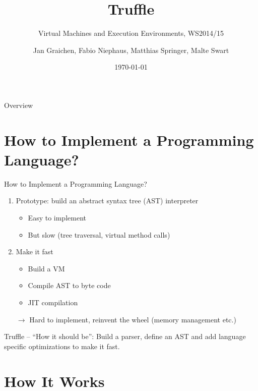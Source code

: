 \documentclass[xcolor=dvipsname,handout]{beamer}
\title{Truffle}
\subtitle{Virtual Machines and Execution Environments, WS2014/15}
\author{Jan Graichen, Fabio Niephaus, Matthias Springer, Malte Swart}
\date{\today}
\institute[2012]{Hasso Plattner Institute, Software Architecture Group}
\begin{document}
\begin{frame}[plain]
	\maketitle
\end{frame}
\begin{frame}{Overview}
	\tableofcontents[hideallsubsections]
\end{frame}

\section{How to Implement a Programming Language?}

\begin{frame}{How to Implement a Programming Language?}
    \begin{enumerate}
        \item Prototype: build an abstract syntax tree (AST) interpreter
        \begin{itemize}
          \item Easy to implement
          \item But slow (tree traversal, virtual method calls)
        \end{itemize}
        \item Make it fast
        \begin{itemize}
          \item Build a VM
          \item Compile AST to byte code
          \item JIT compilation
        \end{itemize}
        $\rightarrow$ Hard to implement, reinvent the wheel (memory management etc.)
    \end{enumerate}

    \vfill
    \begin{alertblock}{Truffle -- ``How it should be'':}
        Build a parser, define an AST and add language specific optimizations to make it fast.
    \end{alertblock}
\end{frame}


\section{How It Works}
\end{document}
